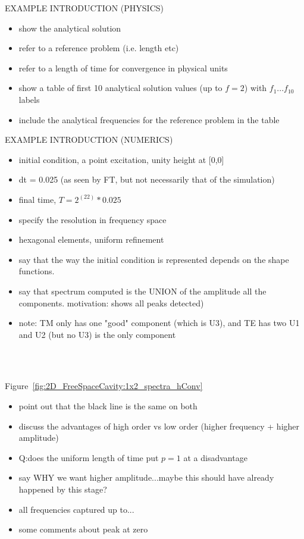 EXAMPLE INTRODUCTION (PHYSICS)
\begin{itemize}
\item show the analytical solution
\item refer to a reference problem (i.e. length etc)
\item refer to a length of time for convergence in physical units
\item show a table of first 10 analytical solution values (up to $f=2$) with $f_1...f_10$ labels
\item include the analytical frequencies for the reference problem in the table
\end{itemize}
  
EXAMPLE INTRODUCTION (NUMERICS)
\begin{itemize}
\item initial condition, a point excitation, unity height at [0,0]
\item dt = 0.025 (as seen by FT, but not necessarily that of the simulation)
\item final time, $T = 2^(22) * 0.025$
\item specify the resolution in frequency space
\item hexagonal elements, uniform refinement
\item say that the way the initial condition is represented depends on the shape functions.
\item say that spectrum computed is the UNION of the amplitude all the components. motivation: shows all peaks detected)
\item note: TM only has one "good" component (which is U3), and TE has two U1 and U2 (but no U3) is the only component 
\end{itemize}
\begin{figure}[!ht]
	\centering
  \\
   \\
\end{figure}
Figure~\ref{fig:2D_FreeSpaceCavity:1x2_spectra_hConv}
\begin{itemize}
\item point out that the black line is the same on both
\item discuss the advantages of high order vs low order (higher frequency + higher amplitude)
\item Q:does the uniform length of time put $p=1$ at a disadvantage
\item say WHY we want higher amplitude...maybe this should have already happened by this stage?
\item all frequencies captured up to...
\item some comments about peak at zero
\end{itemize}

